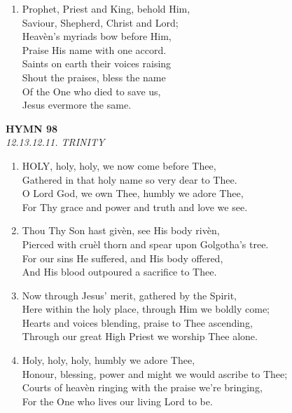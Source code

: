 \documentclass[11pt,a4paper]{article}
\begin{document}
\begin{enumerate}
    \item Prophet, Priest and King, behold Him, \\
        Saviour, Shepherd, Christ and Lord; \\
        Heav\`en's myriads bow before Him, \\
        Praise His name with one accord. \\
        Saints on earth their voices raising \\
        Shout the praises, bless the name \\
        Of the One who died to save us, \\
        Jesus evermore the same.

\end{enumerate}

\newpage
\begin{center}
    {\Large \textbf{HYMN 98\textdagger{}}}
    \\
    \textit{12.13.12.11. TRINITY}
\end{center}
\vspace{1em}

\begin{enumerate}
    \item HOLY, holy, holy, we now come before Thee, \\
        Gathered in that holy name so very dear to Thee. \\
        O Lord God, we own Thee, humbly we adore Thee, \\
        For Thy grace and power and truth and love we see.

    \item Thou Thy Son hast giv\`en, see His body riv\`en, \\
        Pierced with cru\`el thorn and spear upon Golgotha's tree. \\
        For our sins He suffered, and His body offered, \\
        And His blood outpoured a sacrifice to Thee.

    \item Now through Jesus' merit, gathered by the Spirit, \\
        Here within the holy place, through Him we boldly come; \\
        Hearts and voices blending, praise to Thee ascending, \\
        Through our great High Priest we worship Thee alone.

    \item Holy, holy, holy, humbly we adore Thee, \\
        Honour, blessing, power and might we would ascribe to Thee; \\
        Courts of heav\`en ringing with the praise we're bringing, \\
        For the One who lives our living Lord to be.

\end{enumerate}
\end{document}
